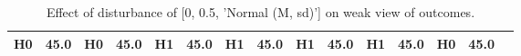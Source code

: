 \begin{table}
\begin{tabular}{l|cc|cc|cc|cc|cc|cc|cc}
\cellcolor{Bittersweet}H0&\cellcolor{Bittersweet}45.0&\cellcolor{Bittersweet}H0&\cellcolor{Bittersweet}45.0&\cellcolor{Bittersweet}H1&\cellcolor{Bittersweet}45.0&\cellcolor{Bittersweet}H1&\cellcolor{Bittersweet}45.0&\cellcolor{Bittersweet}H1&\cellcolor{Bittersweet}45.0&\cellcolor{Bittersweet}H1&\cellcolor{Bittersweet}45.0&\cellcolor{Bittersweet}H0&\cellcolor{Bittersweet}45.0\\\bottomrule\end{tabular}\caption{Effect of disturbance of [0, 0.5, 'Normal (M, sd)'] on weak view of outcomes.}\end{table}